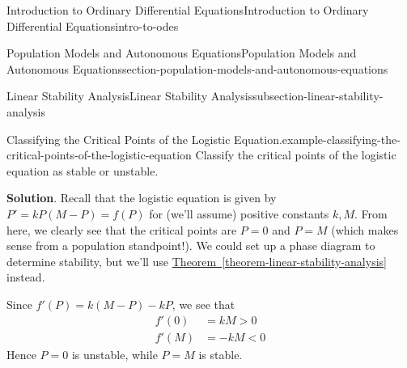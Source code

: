 \documentclass[oneside,10pt,]{book}
\numberwithin{equation}{section}
\newcommand{\lt}{<}
\newcommand{\gt}{>}
\begin{document}
\begin{chapterptx}{Introduction to Ordinary Differential Equations}{}{Introduction to Ordinary Differential Equations}{}{}{intro-to-odes}
\begin{sectionptx}{Population Models and Autonomous Equations}{}{Population Models and Autonomous Equations}{}{}{section-population-models-and-autonomous-equations}
\begin{subsectionptx}{Linear Stability Analysis}{}{Linear Stability Analysis}{}{}{subsection-linear-stability-analysis}
\begin{example}{Classifying the Critical Points of the Logistic Equation.}{example-classifying-the-critical-points-of-the-logistic-equation}
\hypertarget{p-140}{}%
Classify the critical points of the logistic equation as stable or unstable.%
\par\smallskip%
\noindent\textbf{Solution}.\hypertarget{solution-23}{}\quad%
\hypertarget{p-141}{}%
Recall that the logistic equation is given by \(P' = kP(M-P) = f(P)\) for (we'll assume) positive constants \(k,M\). From here, we clearly see that the critical points are \(P = 0\) and \(P = M\) (which makes sense from a population standpoint!). We could set up a phase diagram to determine stability, but we'll use \hyperref[theorem-linear-stability-analysis]{Theorem~\ref{theorem-linear-stability-analysis}} instead.%
\par
\hypertarget{p-142}{}%
Since \(f'(P) = k(M-P) - kP\), we see that%
\begin{align*}
f'(0) & = kM \gt 0\\
f'(M) & = -kM \lt 0 
\end{align*}
Hence \(P = 0\) is unstable, while \(P = M\) is stable.%
\end{example}
\end{subsectionptx}
\end{sectionptx}
\end{chapterptx}
%
%
\typeout{************************************************}
\typeout{************************************************}
%
\end{document}
